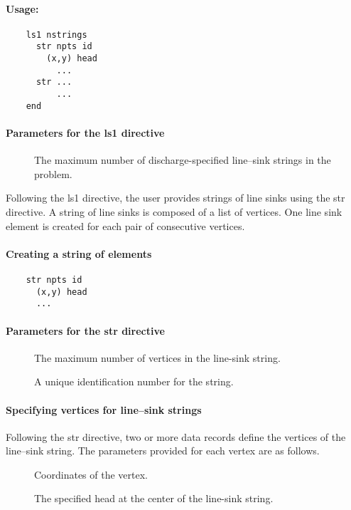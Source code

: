 \paragraph{Usage:}
\begin{verbatim}
    ls1 nstrings
      str npts id
        (x,y) head 
          ...
      str ...
          ...
    end
\end{verbatim}

\paragraph{Parameters for the \textsf{ls1} directive}
\begin{description}
\item [] The maximum number of discharge-specified 
    line--sink strings in the problem. \units{-}
\end{description}
Following the \textsf{ls1} directive, the user provides strings
of line sinks using the \textsf{str} directive. A string of line sinks
is composed of a list of vertices. One line sink element is created
for each pair of consecutive vertices.

\paragraph{Creating a string of elements}
\begin{verbatim}
    str npts id
      (x,y) head
      ...
\end{verbatim}

\paragraph{Parameters for the \textsf{str} directive }
\begin{description}
\item [] The maximum number of vertices in the line-sink
string. \units{-}
\item [] A unique identification number for the string. \units{-}
\end{description}

\paragraph{Specifying vertices for line--sink strings}
Following the \textsf{str} directive, two or more data records define
the vertices of the line--sink string. The parameters provided for
each vertex are as follows.
\begin{description}
\item [] Coordinates of the vertex. 
\item [] The specified head at the center of the line-sink
   string. 
\end{description}
\newpage

